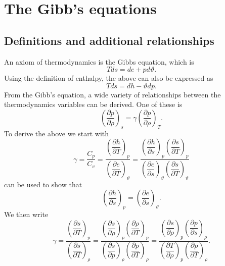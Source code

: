 \documentclass[oneside,a4paper,11pt]{report}
\begin{document}
\section{The Gibb's equations}
\subsection{Definitions and additional relationships}
An axiom of thermodynamics is the Gibbs equation, which is
\begin{equation}
\label{eq:gibbs_form_1}
    Tds = de + pd\vartheta.
\end{equation}
Using the definition of enthalpy, the above can also be expressed as
\begin{equation}
\label{eq:gibbs_form_2}
    Tds = dh - \vartheta dp.
\end{equation}
From the Gibb's equation, a wide variety of relationships between the thermodynamics variables can be derived. One of these is
\begin{equation}
\label{eq:thermo_relationship_for_sos}
    \left(\frac{\partial p}{\partial \rho} \right)_s = \gamma \left ( \frac{\partial p}{\partial \rho} \right)_T.
\end{equation}
To derive the above we start with
\begin{equation}
    \gamma = \frac{C_p}{C_v} = \frac{ \left(\dfrac{\partial h}{\partial T}\right)_p }{ \left ( \dfrac{\partial e}{\partial T} \right)_\vartheta } = \frac{ \left(\dfrac{\partial h}{\partial s}\right)_p \left(\dfrac{\partial s}{\partial T}\right)_p }{ \left ( \dfrac{\partial e}{\partial s} \right)_\vartheta \left ( \dfrac{\partial s}{\partial T} \right)_\vartheta}
\end{equation}
 can be used to show that 
\begin{equation}
    \left(\dfrac{\partial h}{\partial s}\right)_p = \left ( \dfrac{\partial e}{\partial s} \right)_\vartheta .
\end{equation}
We then write
\begin{equation}
\gamma = \frac{ \left( \dfrac{\partial s}{\partial T} \right)_p}{ \left( \dfrac{\partial s}{\partial T} \right)_\rho } = \frac{ \left(\dfrac{\partial s}{\partial \rho} \right)_p \left(\dfrac{\partial \rho}{\partial T} \right)_p }{ \left(\dfrac{\partial s}{\partial p} \right)_\rho \left(\dfrac{\partial p}{\partial T} \right)_\rho} = \frac{ \left(\dfrac{\partial s}{\partial \rho} \right)_p \left(\dfrac{\partial p}{\partial s} \right)_\rho }{ \left(\dfrac{\partial T}{\partial \rho} \right)_p \left(\dfrac{\partial p}{\partial T} \right)_\rho}.
\end{equation}
\end{document}
